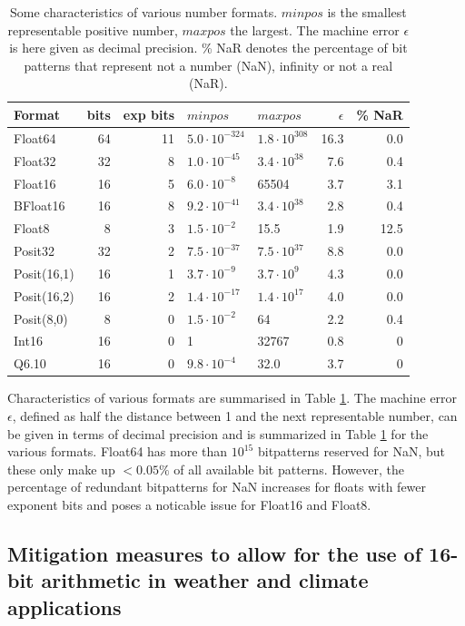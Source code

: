 \documentclass[draft]{agujournal2019}
\begin{document}
\begin{table}[htbp]
\center
\begin{tabular}{l | r | r | l | l | r | r}
Format & bits & exp bits & $minpos$ & $maxpos$ & $\epsilon$ &  \% NaR \\
\hline
Float64	& 64 & 11 & $5.0 \cdot 10^{-324}$ & $1.8 \cdot 10^{308}$  & 16.3 & 0.0 \\
Float32	& 32 & 8 & $1.0 \cdot 10^{-45}$ & $3.4 \cdot 10^{38}$ & 7.6 & 0.4 \\
Float16	& 16 & 5 & $6.0 \cdot 10^{-8}$ & 65504 & 3.7 & 3.1 \\
BFloat16	& 16 & 8 & $ 9.2 \cdot 10^{-41}$ & $3.4 \cdot 10^{38}$ & 2.8 & 0.4  \\
Float8 & 8 & 3 & $1.5 \cdot 10^{-2}$ & 15.5 & 1.9 &12.5\\
\hline
Posit32	& 32 & 2 &  $7.5 \cdot 10^{-37}$ & $7.5 \cdot 10^{37}$ & 8.8 & 0.0 \\
Posit(16,1) & 16 & 1 & $3.7 \cdot 10^{-9}$ & $3.7 \cdot 10^{9}$ & 4.3 & 0.0\\
Posit(16,2) & 16 & 2 & $1.4 \cdot 10^{-17}$ & $1.4 \cdot 10^{17}$ & 4.0 & 0.0\\
Posit(8,0) & 8 & 0 & $1.5 \cdot 10^{-2}$ & 64 & 2.2 & 0.4  \\
\hline
Int16 & 16 & 0 & 1 & 32767 & 0.8 & 0\\
Q6.10 & 16 & 0 & $9.8 \cdot 10^{-4}$ & 32.0 & 3.7 & 0
\end{tabular}
\vspace{10pt}
\caption{Some characteristics of various number formats. $minpos$ is the smallest representable positive number, $maxpos$ the largest. The machine error $\epsilon$ is here given as decimal precision. \% NaR denotes the percentage of bit patterns that represent not a number (NaN), infinity or not a real (NaR).}
\label{tab:formats}
\end{table}

Characteristics of various formats are summarised in Table \ref{tab:formats}. The machine error $\epsilon$, defined as half the distance between 1 and the next representable number, can be given in terms of decimal precision and is summarized in Table \ref{tab:formats} for the various formats. Float64 has more than $10^{15}$ bitpatterns reserved for NaN, but these only make up $< 0.05\%$ of all available bit patterns. However, the percentage of redundant bitpatterns for NaN increases for floats with fewer exponent bits and poses a noticable issue for Float16 and Float8.


\subsection{Mitigation measures to allow for the use of 16-bit arithmetic in weather and climate applications}
\end{document}
